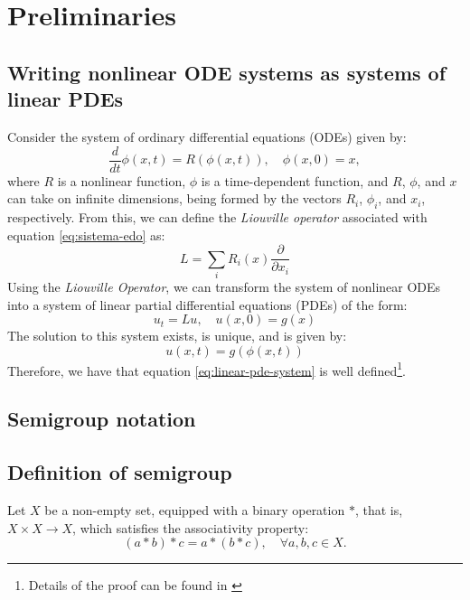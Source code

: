 \documentclass[12pt]{article}
\begin{document}
\section{Preliminaries}
\subsection{Writing nonlinear ODE systems as systems of linear PDEs}
Consider the system of ordinary differential equations (ODEs) given by:
\begin{equation}
    \frac{d}{dt} \phi(x,t) = R(\phi(x,t)), \quad \phi(x, 0) = x,
    \label{eq:sistema-edo}
\end{equation}
where $R$ is a nonlinear function, $\phi$ is a time-dependent function, and $R$, $\phi$, and $x$ can take on infinite dimensions, being formed by the vectors $R_i$, $\phi_i$, and $x_i$, respectively.
From this, we can define the \textit{Liouville operator} associated with equation \eqref{eq:sistema-edo} as:
\begin{equation}
    L = \sum_i R_i(x) \frac{\partial}{\partial x_i}
    \label{eq:liouville-operator}
\end{equation}
Using the \textit{Liouville Operator}, we can transform the system of nonlinear ODEs into a system of linear partial differential equations (PDEs) of the form:
\begin{equation}
    
u_t = Lu, \quad u(x,0) = g(x)
    \label{eq:linear-pde-system}
\end{equation}
The solution to this system exists, is unique, and is given by:
\begin{equation}
    u(x,t) = g(\phi(x,t))   
    \label{eq:solution-linear-pde-system}
\end{equation}
Therefore, we have that equation \eqref{eq:linear-pde-system} is well defined\footnote{Details of the proof can be found in \citet[p.~181-182]{Chorin2013}}.
\subsection{Semigroup notation}
\subsection{Definition of semigroup}
Let $X$ be a non-empty set, equipped with a binary operation $ * $, that is, $ X \times X \to X $, which satisfies the associativity property:
\begin{equation*}
    
(a * b) * c = a * (b * c), \quad \forall a,b,c \in X.
\end{equation*}
\end{document}
